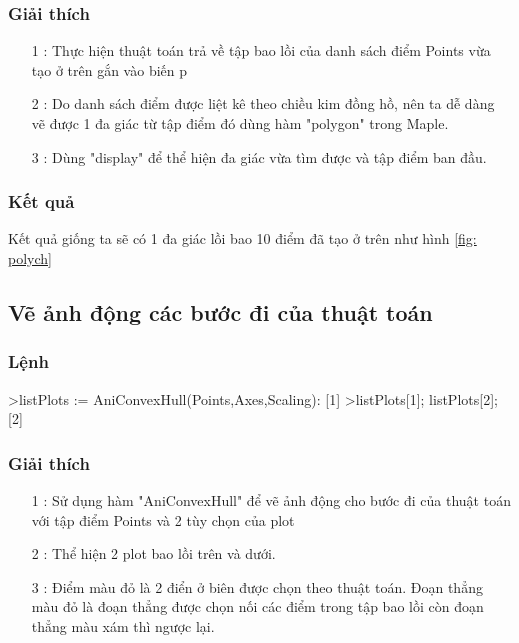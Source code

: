 \documentclass[12pt]{article}
\begin{document}
            \subsubsection*{Giải thích}
              \begin{itemize}
                \item [1]: Thực hiện thuật toán trả về tập bao lồi của danh sách điểm Points vừa tạo ở trên gắn vào biến p
                \item [2]: Do danh sách điểm được liệt kê theo chiều kim đồng hồ, nên ta dễ dàng vẽ được 1 đa giác từ tập điểm đó dùng hàm "polygon" trong Maple.
                \item [3]: Dùng "display" để thể hiện đa giác vừa tìm được và tập điểm ban đầu.
              \end{itemize}
            \subsubsection*{Kết quả}
              Kết quả giống ta sẽ có 1 đa giác lồi bao 10 điểm đã tạo ở trên như hình \ref{fig: polych}
              \newpage
        \subsection{Vẽ ảnh động các bước đi của thuật toán}
          \subsubsection*{Lệnh}
            \begin{spverbatim}
    >listPlots := AniConvexHull(Points,Axes,Scaling):  [1]
    >listPlots[1]; listPlots[2]; [2]
            \end{spverbatim}
          \subsubsection*{Giải thích}
            \begin{itemize}
              \item [1]: Sử dụng hàm "AniConvexHull" để vẽ ảnh động cho bước đi của thuật toán với tập điểm Points và 2 tùy chọn của plot
              \item [2]: Thể hiện 2 plot bao lồi trên và dưới.
              \item [3]: Điểm màu đỏ là 2 điển ở biên được chọn theo thuật toán. Đoạn thẳng màu đỏ là đoạn thẳng được chọn nối các điểm trong tập bao lồi 
              còn đoạn thẳng màu xám thì ngược lại. 
            \end{itemize}
\end{document}
